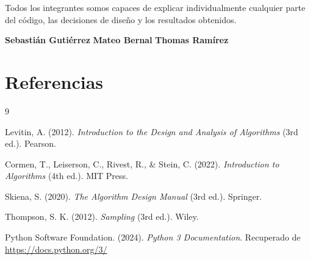 \documentclass[12pt, a4paper]{article}
\begin{document}
Todos los integrantes somos capaces de explicar individualmente cualquier parte del código, las decisiones de diseño y los resultados obtenidos.

\vspace{0.5cm}
\noindent\textbf{Sebastián Gutiérrez} \hfill \textbf{Mateo Bernal} \hfill \textbf{Thomas Ramírez}

\section*{Referencias}

\begin{thebibliography}{9}

  Levitin, A. (2012). \textit{Introduction to the Design and Analysis of Algorithms} (3rd ed.). Pearson.

  Cormen, T., Leiserson, C., Rivest, R., \& Stein, C. (2022). \textit{Introduction to Algorithms} (4th ed.). MIT Press.

  Skiena, S. (2020). \textit{The Algorithm Design Manual} (3rd ed.). Springer.

  Thompson, S. K. (2012). \textit{Sampling} (3rd ed.). Wiley.

  Python Software Foundation. (2024). \textit{Python 3 Documentation}. Recuperado de \url{https://docs.python.org/3/}

\end{thebibliography}
\end{document}
